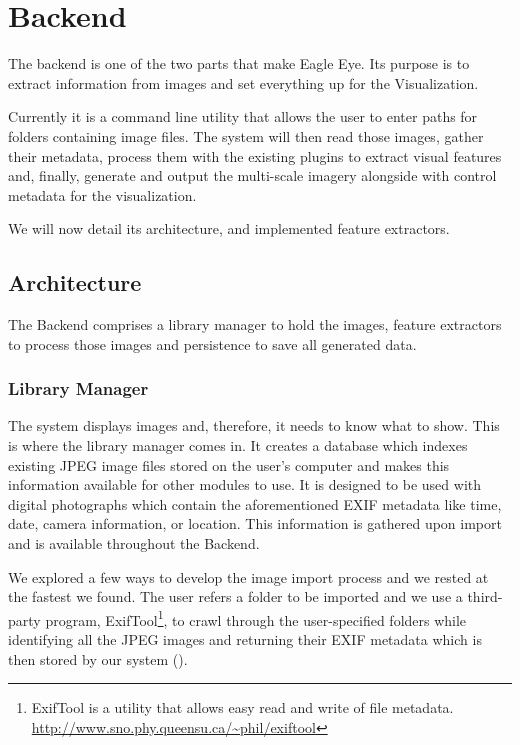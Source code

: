 \section{Backend} %
\label{sub:backend}

The backend is one of the two parts that make Eagle Eye. Its purpose is to extract information from images and set everything up for the Visualization.

Currently it is a command line utility that allows the user to enter paths for folders containing image files. The system will then read those images, gather their metadata, process them with the existing plugins to extract visual features and, finally, generate and output the multi-scale imagery  alongside with control metadata for the visualization.

We will now detail its architecture, and implemented feature extractors.

\subsection{Architecture}

The Backend comprises a library manager to hold the images, feature extractors to process those images and persistence to save all generated data.


\subsubsection{Library Manager} %
\label{ssub:library_manager}

The system displays images and, therefore, it needs to know what to show. This is where the library manager comes in. It creates a database which indexes existing JPEG image files stored on the user's computer and makes this information available for other modules to use. It is designed to be used with digital photographs which contain the aforementioned EXIF metadata like time, date, camera information, or location. This information is gathered upon import and is available throughout the Backend.

We explored a few ways to develop the image import process and we rested at the fastest we found. The user refers a folder to be imported and we use a third-party program, ExifTool\footnote{ExifTool is a utility that allows easy read and write of file metadata. \url{http://www.sno.phy.queensu.ca/~phil/exiftool}}, to crawl through the user-specified folders while identifying all the JPEG images and returning their \ac{EXIF} metadata which is then stored by our system ().


